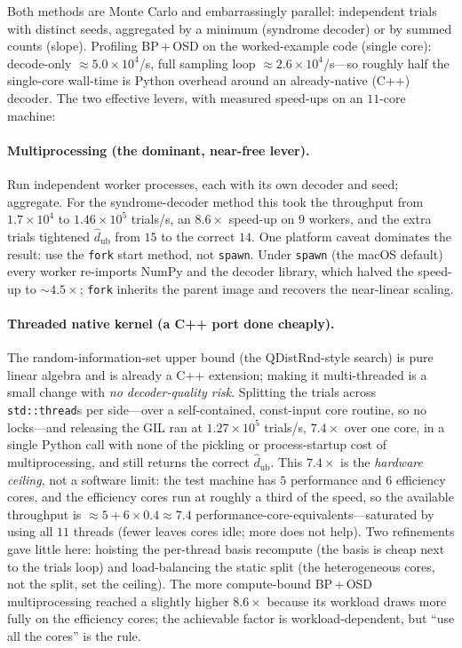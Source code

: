 \documentclass[11pt]{article}
\newcommand{\dub}{\hat d_{\mathrm{ub}}}
\begin{document}
Both methods are Monte Carlo and embarrassingly parallel: independent trials with
distinct seeds, aggregated by a minimum (syndrome decoder) or by summed counts
(slope). Profiling BP\,+\,OSD on the worked-example code (single core): decode-only
$\approx 5.0\times10^4$/s, full sampling loop $\approx 2.6\times10^4$/s---so
roughly half the single-core wall-time is Python overhead around an
already-native (C++) decoder. The two effective levers, with measured speed-ups on
an $11$-core machine:

\paragraph{Multiprocessing (the dominant, near-free lever).} Run independent
worker processes, each with its own decoder and seed; aggregate. For the
syndrome-decoder method this took the throughput from $1.7\times10^4$ to
$1.46\times10^5$ trials/s, an $\mathbf{8.6\times}$ speed-up on $9$ workers, and the
extra trials tightened $\dub$ from $15$ to the correct $14$. One platform
caveat dominates the result: use the \texttt{fork} start method, not
\texttt{spawn}. Under \texttt{spawn} (the macOS default) every worker re-imports
NumPy and the decoder library, which halved the speed-up to $\sim4.5\times$;
\texttt{fork} inherits the parent image and recovers the near-linear scaling.

\paragraph{Threaded native kernel (a C++ port done cheaply).} The
random-information-set upper bound (the QDistRnd-style search) is pure linear
algebra and is already a C++ extension; making it multi-threaded is a small change
with \emph{no decoder-quality risk}. Splitting the trials across \texttt{std::thread}s
per side---over a self-contained, const-input core routine, so no locks---and
releasing the GIL ran at $1.27\times10^5$ trials/s, $\mathbf{7.4\times}$ over one
core, in a single Python call with none of the pickling or process-startup cost of
multiprocessing, and still returns the correct $\dub$. This $7.4\times$ is the
\emph{hardware ceiling}, not a software limit: the test machine has $5$ performance
and $6$ efficiency cores, and the efficiency cores run at roughly a third of the
speed, so the available throughput is $\approx 5 + 6\times0.4 \approx 7.4$
performance-core-equivalents---saturated by using all $11$ threads (fewer leaves
cores idle; more does not help). Two refinements gave little here: hoisting the
per-thread basis recompute (the basis is cheap next to the trials loop) and
load-balancing the static split (the heterogeneous cores, not the split, set the
ceiling). The more compute-bound BP\,+\,OSD multiprocessing reached a slightly
higher $8.6\times$ because its workload draws more fully on the efficiency cores;
the achievable factor is workload-dependent, but ``use all the cores'' is the rule.
\end{document}
